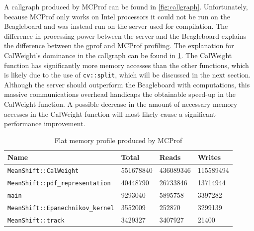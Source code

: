 \documentclass[final]{article}
\begin{document}
A callgraph produced by MCProf can be found in \cref{fig:callgraph}. Unfortunately, because MCProf only works on Intel processors it could not be run on the Beagleboard and was instead run on the server used for compilation. The difference in processing power between the server and the Beagleboard explains the difference between the gprof and MCProf profiling. The explanation for CalWeight's dominance in the callgraph can be found in \cref{tab:memprofile}. The CalWeight function has significantly more memory accesses than the other functions, which is likely due to the use of \texttt{cv::split}, which will be discussed in the next section. Although the server should outperform the Beagleboard with computations, this massive communications overhead handicaps the obtainable speed-up in the CalWeight function. A possible decrease in the amount of necessary memory accesses in the CalWeight function will most likely cause a significant performance improvement.

\begin{table}[H]
\centering
\caption{Flat memory profile produced by MCProf}
\label{tab:memprofile}
\begin{tabular}{llll}
\toprule
\textbf{Name} & \textbf{Total} & \textbf{Reads} & \textbf{Writes}\\
\midrule
\texttt{MeanShift::CalWeight}   &  551678840  &   436089346   &  115589494\\
\texttt{MeanShift::pdf\_representation}    &  40448790  &    26733846   &   13714944\\
\texttt{main}   &    9293040   &    5895758    &  3397282\\
\texttt{MeanShift::Epanechnikov\_kernel}    &   3552009       & 252870  &     3299139\\
\texttt{MeanShift::track}   &    3429327   &    3407927      &   21400\\
\bottomrule
\end{tabular}
\end{table}
\end{document}
